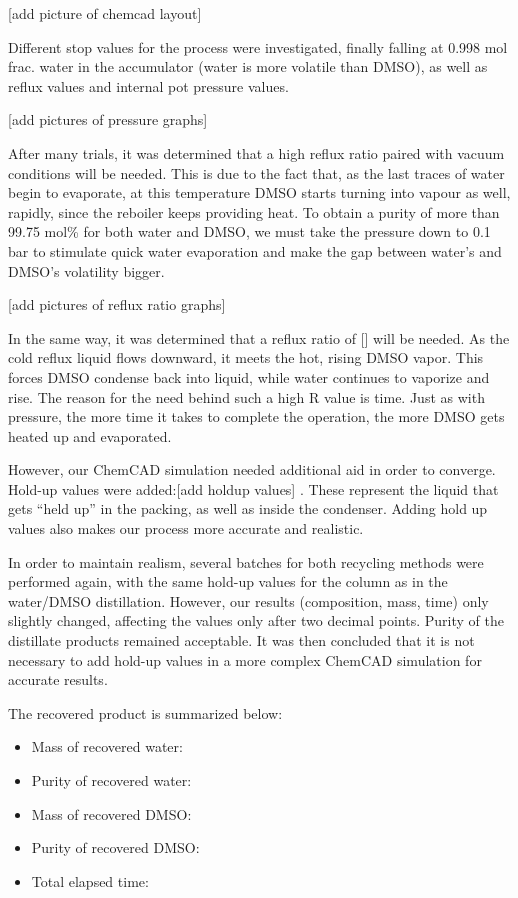 {[}add picture of chemcad layout{]}

Different stop values for the process were investigated, finally falling
at 0.998 mol frac. water in the accumulator (water is more volatile than
DMSO), as well as reflux values and internal pot pressure values.

{[}add pictures of pressure graphs{]}

After many trials, it was determined that a high reflux ratio paired
with vacuum conditions will be needed. This is due to the fact that, as
the last traces of water begin to evaporate, at this temperature DMSO
starts turning into vapour as well, rapidly, since the reboiler keeps
providing heat. To obtain a purity of more than 99.75 mol\% for both
water and DMSO, we must take the pressure down to 0.1 bar to stimulate
quick water evaporation and make the gap between water's and DMSO's
volatility bigger.

{[}add pictures of reflux ratio graphs{]}

In the same way, it was determined that a reflux ratio of {[}{]} will be
needed. As the cold reflux liquid flows downward, it meets the hot,
rising DMSO vapor. This forces DMSO condense back into liquid, while
water continues to vaporize and rise. The reason for the need behind
such a high R value is time. Just as with pressure, the more time it
takes to complete the operation, the more DMSO gets heated up and
evaporated.

However, our ChemCAD simulation needed additional aid in order to
converge. Hold-up values were added:{[}add holdup values{]} . These
represent the liquid that gets ``held up'' in the packing, as well as
inside the condenser. Adding hold up values also makes our process more
accurate and realistic.

In order to maintain realism, several batches for both recycling methods
were performed again, with the same hold-up values for the column as in
the water/DMSO distillation. However, our results (composition, mass,
time) only slightly changed, affecting the values only after two decimal
points. Purity of the distillate products remained acceptable. It was
then concluded that it is not necessary to add hold-up values in a more
complex ChemCAD simulation for accurate results.

The recovered product is summarized below:

\begin{itemize}
\tightlist
\item
  Mass of recovered water:
\item
  Purity of recovered water:
\item
  Mass of recovered DMSO:
\item
  Purity of recovered DMSO:
\item
  Total elapsed time:
\end{itemize}

